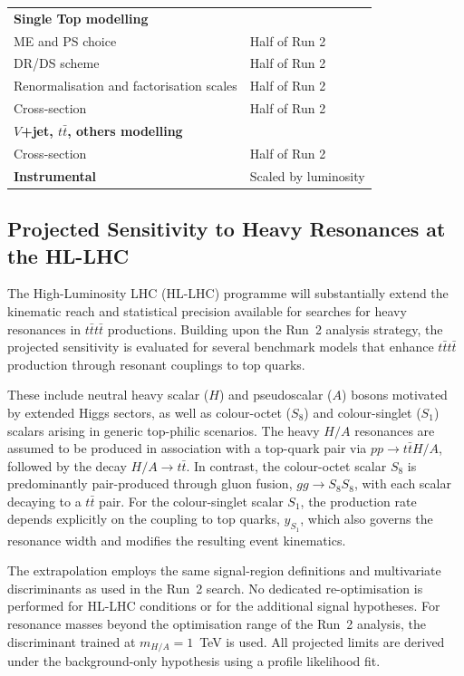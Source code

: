 \begin{table}[htbp]
\begin{tabular}{p{} p{}}
\multicolumn{2}{l}{\textbf{Single Top modelling}} \\
ME and PS choice & Half of Run 2 \\
DR/DS scheme & Half of Run 2 \\
Renormalisation and factorisation scales & Half of Run 2 \\
Cross-section & Half of Run 2 \\

\multicolumn{2}{l}{\textbf{\boldmath $V$+jet, $t\bar{t}$, others modelling}} \\
Cross-section & Half of Run 2 \\
\midrule

\textbf{Instrumental} & Scaled by luminosity \\
\bottomrule
\end{tabular}
\end{table}

\subsection{Projected Sensitivity to Heavy Resonances at the HL-LHC}
\label{sec:HL_signal_models}

The High-Luminosity LHC (HL-LHC) programme will substantially extend the kinematic reach and statistical precision available for searches for heavy resonances in $t\bar{t}t\bar{t}$ productions. 
Building upon the Run~2 analysis strategy, the projected sensitivity is evaluated for several benchmark models that enhance $t\bar{t}t\bar{t}$ production through resonant couplings to top quarks.

These include neutral heavy scalar ($H$) and pseudoscalar ($A$) bosons motivated by extended Higgs sectors, as well as colour-octet ($S_8$) and colour-singlet ($S_1$) scalars arising in generic top-philic scenarios. 
The heavy $H/A$ resonances are assumed to be produced in association with a top-quark pair via $pp \to t\bar{t}H/A$, followed by the decay $H/A \to t\bar{t}$. 
In contrast, the colour-octet scalar $S_8$ is predominantly pair-produced through gluon fusion, $gg \to S_8 S_8$, with each scalar decaying to a $t\bar{t}$ pair. 
For the colour-singlet scalar $S_1$, the production rate depends explicitly on the coupling to top quarks, $y_{S_1}$, which also governs the resonance width and modifies the resulting event kinematics.

The extrapolation employs the same signal-region definitions and multivariate discriminants as used in the Run~2 search. 
No dedicated re-optimisation is performed for HL-LHC conditions or for the additional signal hypotheses. 
For resonance masses beyond the optimisation range of the Run~2 analysis, the discriminant trained at $m_{H/A}=1$~TeV is used. 
All projected limits are derived under the background-only hypothesis using a profile likelihood fit.

